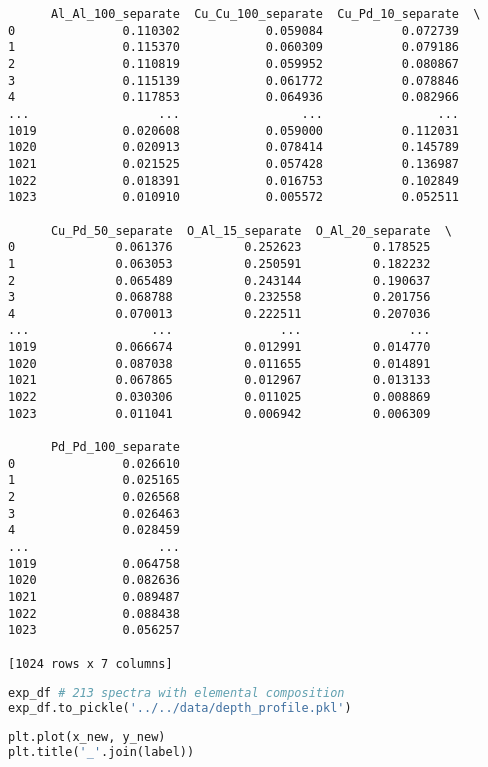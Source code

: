 \begin{lstlisting}
      Al_Al_100_separate  Cu_Cu_100_separate  Cu_Pd_10_separate  \
0               0.110302            0.059084           0.072739   
1               0.115370            0.060309           0.079186   
2               0.110819            0.059952           0.080867   
3               0.115139            0.061772           0.078846   
4               0.117853            0.064936           0.082966   
...                  ...                 ...                ...   
1019            0.020608            0.059000           0.112031   
1020            0.020913            0.078414           0.145789   
1021            0.021525            0.057428           0.136987   
1022            0.018391            0.016753           0.102849   
1023            0.010910            0.005572           0.052511   

      Cu_Pd_50_separate  O_Al_15_separate  O_Al_20_separate  \
0              0.061376          0.252623          0.178525   
1              0.063053          0.250591          0.182232   
2              0.065489          0.243144          0.190637   
3              0.068788          0.232558          0.201756   
4              0.070013          0.222511          0.207036   
...                 ...               ...               ...   
1019           0.066674          0.012991          0.014770   
1020           0.087038          0.011655          0.014891   
1021           0.067865          0.012967          0.013133   
1022           0.030306          0.011025          0.008869   
1023           0.011041          0.006942          0.006309   

      Pd_Pd_100_separate  
0               0.026610  
1               0.025165  
2               0.026568  
3               0.026463  
4               0.028459  
...                  ...  
1019            0.064758  
1020            0.082636  
1021            0.089487  
1022            0.088438  
1023            0.056257  

[1024 rows x 7 columns]
\end{lstlisting}

\begin{lstlisting}[language=Python]
exp_df # 213 spectra with elemental composition
exp_df.to_pickle('../../data/depth_profile.pkl')
\end{lstlisting}

\begin{lstlisting}[language=Python]
plt.plot(x_new, y_new)
plt.title('_'.join(label))
\end{lstlisting}

